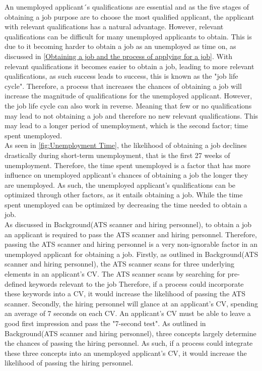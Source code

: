 An unemployed applicant´s qualifications are essential and as the five stages of obtaining a job purpose are to choose the most qualified applicant, the applicant with relevant qualifications has a natural advantage.
However, relevant qualifications can be difficult for many unemployed applicants to obtain.
This is due to it becoming harder to obtain a job as an unemployed as time on, as discussed in \ref{Obtaining a job and the process of applying for a job}.
With relevant qualifications it becomes easier to obtain a job, leading to more relevant qualifications, as such success leads to success, this is known as the "job life cycle".\cite{Job_Cycle}
Therefore, a process that increases the chances of obtaining a job will increase the magnitude of qualifications for the unemployed applicant.
However, the job life cycle can also work in reverse.
Meaning that few or no qualifications may lead to not obtaining a job and therefore no new relevant qualifications.
This may lead to a longer period of unemployment, which is the second factor; time spent unemployed. \\

As seen in \ref{fig:Unemployment Time}, the likelihood of obtaining a job declines drastically during short-term unemployment, that is the first 27 weeks of unemployment.
Therefore, the time spent unemployed is a factor that has more influence on unemployed applicant's chances of obtaining a job the longer they are unemployed.
As such, the unemployed applicant's qualifications can be optimized through other factors, as it entails obtaining a job.
While the time spent unemployed can be optimized by decreasing the time needed to obtain a job. \\

As discussed in Background(ATS scanner and hiring personnel), to obtain a job an applicant is required to pass the ATS scanner and hiring personnel.
Therefore, passing the ATS scanner and hiring personnel is a very non-ignorable factor in an unemployed applicant for obtaining a job.
Firstly, as outlined in Background(ATS scanner and hiring personnel), the ATS scanner scans for three underlying elements in an applicant's CV.
The ATS scanner scans by searching for pre-defined keywords relevant to the job
Therefore, if a process could incorporate these keywords into a CV, it would increase the likelihood of passing the ATS scanner.
Secondly, the hiring personnel will glance at an applicant's CV, spending an average of 7 seconds on each CV.
An applicant's CV must be able to leave a good first impression and pass the "7-second test".
As outlined in Background(ATS scanner and hiring personnel), three concepts largely determine the chances of passing the hiring personnel.
As such, if a process could integrate these three concepts into an unemployed applicant's CV, it would increase the likelihood of passing the hiring personnel. \\

